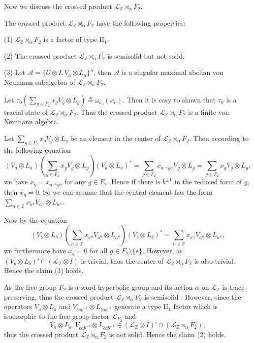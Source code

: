 \documentclass[12pt]{article}
\begin{document}
Now we discuss the crossed product
$\mathcal{L}_{\mathbb{Z}}\rtimes_{\alpha}F_{2}$.\vskip6pt

 The crossed product
$\mathcal{L}_{\mathbb{Z}}\rtimes_{\alpha}F_{2}$ have the following
properties:\vskip4pt

(1) $\mathcal{L}_{\mathbb{Z}}\rtimes_{\alpha}F_{2}$ is a factor of
type $\mathrm{II}_{1}$, \vskip4pt

(2) The crossed product
$\mathcal{L}_{\mathbb{Z}}\rtimes_{\alpha}F_{2}$ is semisolid but not
solid,

\vskip4pt

(3) Let $\mathcal{A}=\{U\otimes I, V_{a}\otimes L_{a}\}''$, then
$\mathcal{A}$ is a singular maximal abelian von Neumann subalgebra
of $\mathcal{L}_{\mathbb{Z}}\rtimes_{\alpha}F_{2}$.\vskip6pt

 Let $\tau_{0}(\sum_{g\in
F_{2}}x_{g}V_{g}\otimes L_{g})\triangleq \omega_{e_{0}}(x_{e})$.
Then it is easy to shown that $\tau_{0}$ is a tracial state of
$\mathcal{L}_{\mathbb{Z}}\rtimes_{\alpha}F_{2}$. Thus the crossed
product $\mathcal{L}_{\mathbb{Z}}\rtimes_{\alpha}F_{2}$ is a finite
von Neumann algebra.

Let $\sum_{g\in F_{2}}x_{g}V_{g}\otimes L_{g}$ be an element in the
center of $\mathcal{L}_{\mathbb{Z}}\rtimes_{\alpha}F_{2}$. Then
according to the following equation
$$(V_{a}\otimes L_{a})(\sum_{g\in
F_{2}}x_{g}V_{g}\otimes L_{g})(V_{a}\otimes L_{a})^{*}=\sum_{g\in
F_{2}}x_{a^{-1}ga}V_{g}\otimes L_{g}=\sum_{g\in
F_{2}}x_{g}V_{g}\otimes L_{g},$$ we have $x_{g}=x_{a^{-1}ga}$ for
any $g\in F_{2}$. Hence if there is $b^{\pm1}$ in the reduced form
of $g$, then $x_{g}=0$. So we can assume that the central element
has the form $\sum_{n\in\mathbb{Z}} x_{a^{n}}V_{a^{n}}\otimes
L_{a^{n}}$.

Now by the equation $$(V_{b}\otimes L_{b})(\sum_{n\in
\mathbb{Z}}x_{a^{n}}V_{a^{n}}\otimes L_{a^{n}})(V_{b}\otimes
L_{b})^{*}=\sum_{n\in\mathbb{Z}}x_{a^{n}}V_{a^{n}}\otimes
L_{a^{n}},$$ we furthermore have $x_{g}=0$ for all $g\in
F_{2}\setminus\{e\}$. However, as $(V_{b}\otimes
L_{b})'\cap(\mathcal{L}_{\mathbb{Z}}\otimes I)$ is trivial, thus the
center of $\mathcal{L}_{\mathbb{Z}}\rtimes_{\alpha}F_{2}$ is also
trivial. Hence the claim (1) holds.

As the free group $F_{2}$ is a word-hyperbolic group and its action
$\alpha$ on $\mathcal{L}_{\mathbb{Z}}$ is trace-preserving, thus the
crossed product $\mathcal{L}_{\mathbb{Z}}\rtimes_{\alpha}F_{2}$ is
semisolid {\cite{[Oz]}}. However, since the operators $V_{a}\otimes
L_{a}$ and $V_{bab^{-1}}\otimes L_{bab^{-1}}$ generate a type
$\mathrm{II}_{1}$ factor which is isomorphic to the free group
factor $\mathcal{L}_{F_{2}}$ and
$$V_{a}\otimes
L_{a}, V_{bab^{-1}}\otimes
L_{bab^{-1}}\in(\mathcal{L}_{\mathbb{Z}}\otimes
I)'\cap(\mathcal{L}_{\mathbb{Z}}\rtimes_{\alpha}F_{2}),$$ thus the
crossed product $\mathcal{L}_{\mathbb{Z}}\rtimes_{\alpha}F_{2}$ is
not solid. Hence the claim (2) holds.
\end{document}

